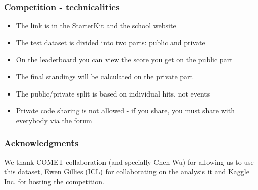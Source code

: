 \documentclass[luatex,mathserif,serif,utf8,table]{beamer}
\begin{document}
\begin{frame}
  \frametitle{Competition - technicalities}
  \begin{itemize}
  \item The link is in the StarterKit and the school website
  \item The test dataset is divided into two parts: public and private
  \item On the leaderboard you can view the score you get on the public part
  \item The final standings will be calculated on the private part
  \item The public/private split is based on individual hits, not events
  \item Private code sharing is not allowed - if you share, you must
    share with everybody via the forum
  \end{itemize}
\end{frame}

\begin{frame}
  \frametitle{Acknowledgments} We thank COMET collaboration (and
  specially Chen Wu) for allowing us to use this dataset, Ewen Gillies
  (ICL) for collaborating on the analysis it and Kaggle Inc. for
  hosting the competition.
\end{frame}
\end{document}
